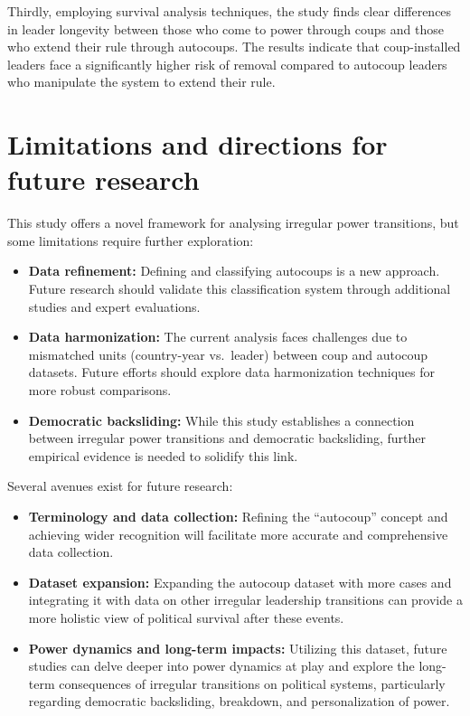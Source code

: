 \documentclass[
  12pt,
]{report}
\begin{document}
Thirdly, employing survival analysis techniques, the study finds clear
differences in leader longevity between those who come to power through
coups and those who extend their rule through autocoups. The results
indicate that coup-installed leaders face a significantly higher risk of
removal compared to autocoup leaders who manipulate the system to extend
their rule.

\section{Limitations and directions for future
research}\label{limitations-and-directions-for-future-research}

This study offers a novel framework for analysing irregular power
transitions, but some limitations require further exploration:

\begin{itemize}
\item
  \textbf{Data refinement:} Defining and classifying autocoups is a new
  approach. Future research should validate this classification system
  through additional studies and expert evaluations.
\item
  \textbf{Data harmonization:} The current analysis faces challenges due
  to mismatched units (country-year vs.~leader) between coup and
  autocoup datasets. Future efforts should explore data harmonization
  techniques for more robust comparisons.
\item
  \textbf{Democratic backsliding:} While this study establishes a
  connection between irregular power transitions and democratic
  backsliding, further empirical evidence is needed to solidify this
  link.
\end{itemize}

Several avenues exist for future research:

\begin{itemize}
\item
  \textbf{Terminology and data collection:} Refining the ``autocoup''
  concept and achieving wider recognition will facilitate more accurate
  and comprehensive data collection.
\item
  \textbf{Dataset expansion:} Expanding the autocoup dataset with more
  cases and integrating it with data on other irregular leadership
  transitions can provide a more holistic view of political survival
  after these events.
\item
  \textbf{Power dynamics and long-term impacts:} Utilizing this dataset,
  future studies can delve deeper into power dynamics at play and
  explore the long-term consequences of irregular transitions on
  political systems, particularly regarding democratic backsliding,
  breakdown, and personalization of power.
\end{itemize}
\end{document}
